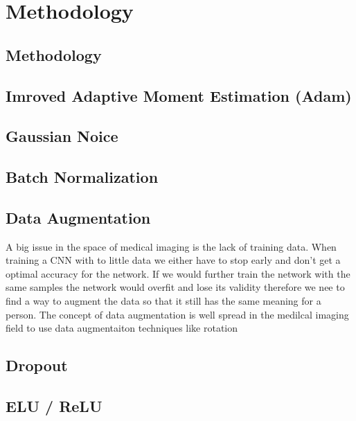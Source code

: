 \documentclass[acmsmall, review]{acmart}
\begin{document}
\section{Methodology}
\subsection{Methodology}
\subsection{Imroved Adaptive Moment Estimation (Adam)}
\subsection{Gaussian Noice}
\begin{comment}
	adding annealed Gaussian noise to the gradien
	-	surprisingly effective
	-	experiments indicate that adding annealed Gaussian noise by decaying the variance works better than using fixed Gaussian noise
	-	-adding n
	-	-random restarts and the use of a momentum-based optimizer like Adam are not sufficient to achieve the best results in the absence of added gradient noiseoise to the gradient helps in achieving higher average and best accuracy	content...
\end{comment}

\subsection{Batch Normalization}
\subsection{Data Augmentation}
A big issue in the space of medical imaging is the lack of training data. When training a CNN with to little data we either have to stop early and don't get a optimal accuracy for the network. If we would further train the network with the same samples the network would overfit and lose its validity  
therefore we nee to find a way to augment the data so that it still has the same meaning for a person. The concept of data augmentation is well spread in the medilcal imaging field 
to use data augmentaiton techniques like rotation 

\subsection{Dropout}

\subsection{ELU / ReLU}
\end{document}
